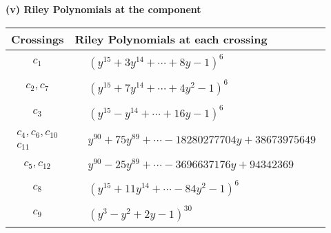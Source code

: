 \documentclass[1p]{elsarticle_modified}
\theoremstyle{definition}
\begin{document}
\newpage\renewcommand{\arraystretch}{1}
\flushleft \textbf{(v) Riley Polynomials at the component}\newline \\
\begin{tabular}{m{50pt}|m{274pt}}
Crossings & \hspace{64pt}Riley Polynomials at each crossing \\
\hline $$\begin{aligned}c_{1}\end{aligned}$$&$\begin{aligned}
&(y^{15}+3 y^{14}+\cdots+8 y-1)^{6}
\end{aligned}$\\
\hline $$\begin{aligned}c_{2},c_{7}\end{aligned}$$&$\begin{aligned}
&(y^{15}+7 y^{14}+\cdots+4 y^2-1)^{6}
\end{aligned}$\\
\hline $$\begin{aligned}c_{3}\end{aligned}$$&$\begin{aligned}
&(y^{15}- y^{14}+\cdots+16 y-1)^{6}
\end{aligned}$\\
\hline $$\begin{aligned}c_{4},c_{6},c_{10}\\c_{11}\end{aligned}$$&$\begin{aligned}
&y^{90}+75 y^{89}+\cdots-18280277704 y+38673975649
\end{aligned}$\\
\hline $$\begin{aligned}c_{5},c_{12}\end{aligned}$$&$\begin{aligned}
&y^{90}-25 y^{89}+\cdots-3696637176 y+94342369
\end{aligned}$\\
\hline $$\begin{aligned}c_{8}\end{aligned}$$&$\begin{aligned}
&(y^{15}+11 y^{14}+\cdots-84 y^2-1)^{6}
\end{aligned}$\\
\hline $$\begin{aligned}c_{9}\end{aligned}$$&$\begin{aligned}
&(y^3- y^2+2 y-1)^{30}
\end{aligned}$\\
\hline
\end{tabular}\\~\\
\end{document}
